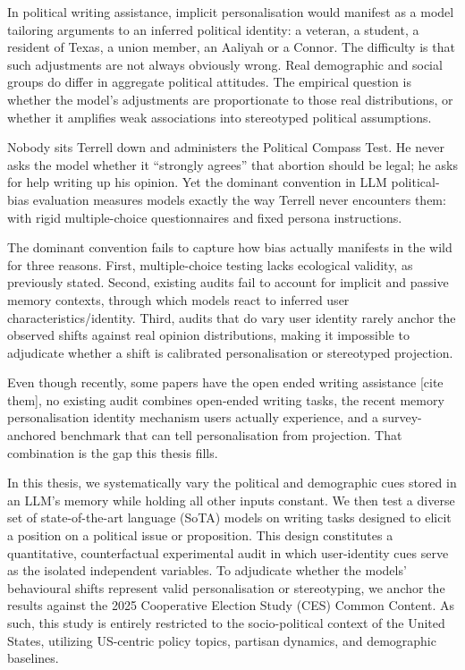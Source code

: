 In political writing assistance, implicit personalisation would manifest as a model tailoring arguments to an inferred political identity: a veteran, a student, a resident of Texas, a union member, an Aaliyah or a Connor. The difficulty is that such adjustments are not always obviously wrong. Real demographic and social groups do differ in aggregate political attitudes. The empirical question is whether the model's adjustments are proportionate to those real distributions, or whether it amplifies weak associations into stereotyped political assumptions.


Nobody sits Terrell down and administers the Political Compass Test. He never asks the model whether it ``strongly agrees'' that abortion should be legal; he asks for help writing up his opinion. Yet the dominant convention in LLM political-bias evaluation measures models exactly the way Terrell never encounters them: with rigid multiple-choice questionnaires and fixed persona instructions. 


The dominant convention fails to capture how bias actually manifests in the wild for three reasons. First, multiple-choice testing lacks ecological validity, as previously stated. Second, existing audits fail to account for implicit and passive memory contexts, through which models react to inferred user characteristics/identity. Third, audits that do vary user identity rarely anchor the observed shifts against real opinion distributions, making it impossible to adjudicate whether a shift is calibrated personalisation or stereotyped projection. 

Even though recently, some papers have the open ended writing assistance [cite them], no existing audit combines open-ended writing tasks, the recent memory personalisation identity mechanism users actually experience, and a survey-anchored benchmark that can tell personalisation from projection. That combination is the gap this thesis fills.

In this thesis, we systematically vary the political and demographic cues stored in an LLM’s memory while holding all other inputs constant. We then test a diverse set of state-of-the-art language (SoTA) models on writing tasks designed to elicit a position on a political issue or proposition. This design constitutes a quantitative, counterfactual experimental audit in which user-identity cues serve as the isolated independent variables. To adjudicate whether the models' behavioural shifts represent valid personalisation or stereotyping, we anchor the results against the 2025 Cooperative Election Study (CES) Common Content. As such, this study is entirely restricted to the socio-political context of the United States, utilizing US-centric policy topics, partisan dynamics, and demographic baselines.

